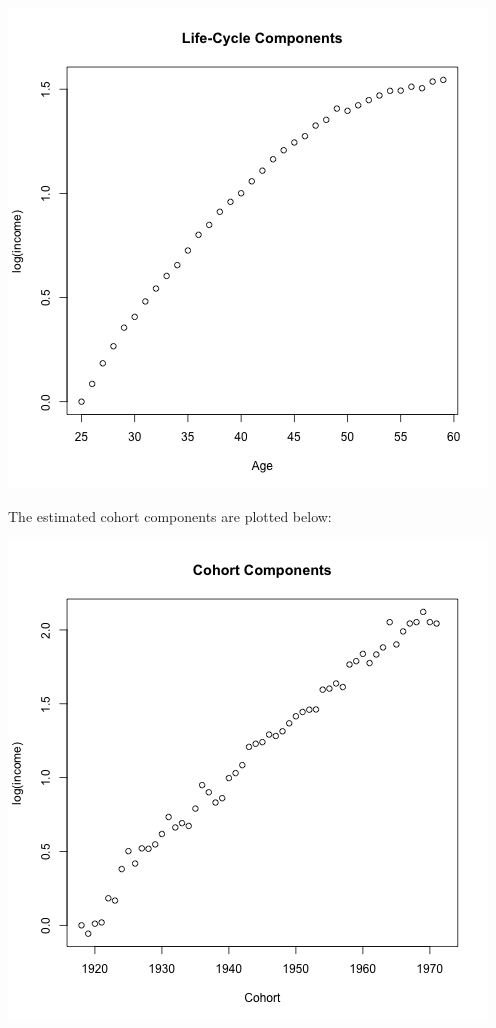 \documentclass{article}
\begin{document}
\begin{itemize}
\includegraphics[scale=.5]{age}

\pagebreak

 The estimated cohort components are plotted below:

\includegraphics[scale=.5]{cohort}



\end{itemize}
\end{document}
